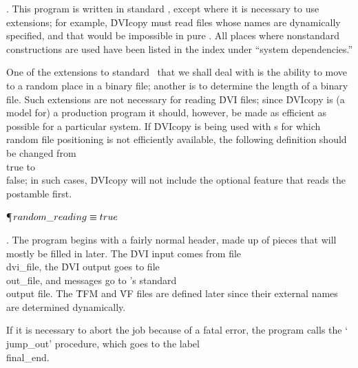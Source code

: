 . This program is written in standard \PASCAL, except where it is necessary
to use extensions; for example, \.{DVIcopy} must read files whose names
are dynamically specified, and that would be impossible in pure \PASCAL.
All places where nonstandard constructions are used have been listed in
the index under ``system dependencies.''

One of the extensions to standard \PASCAL\ that we shall deal with is the
ability to move to a random place in a binary file; another is to
determine the length of a binary file. Such extensions are not necessary
for reading \.{DVI} files; since \.{DVIcopy} is (a model for) a
production program it should, however, be made as efficient as possible
for a particular system. If \.{DVIcopy} is being used with
\PASCAL s for which random file positioning is not efficiently available,
the following definition should be changed from \\{true} to \\{false}; in such
cases, \.{DVIcopy} will not include the optional feature that reads the
postamble first.

\Y\P\D {}$\\{random\_reading}\S\\{true}$%
\par
\fi

. The program begins with a fairly normal header, made up of pieces that
will mostly be filled in later. The \.{DVI} input comes from file
\\{dvi\_file}, the \.{DVI} output goes to file \\{out\_file}, and messages
go to \PASCAL's standard \\{output} file.
The \.{TFM} and \.{VF} files are defined later since their external
names are determined dynamically.

If it is necessary to abort the job because of a fatal error, the program
calls the `\\{jump\_out}' procedure, which goes to the label \\{final\_end}.

